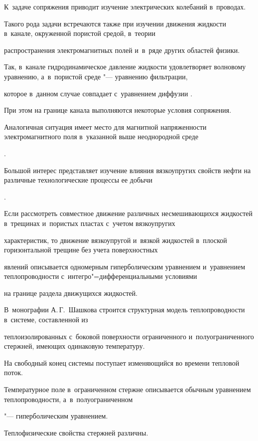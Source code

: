 К~задаче сопряжения приводит изучение электрических колебаний в~проводах.

Такого рода задачи встречаются также при изучении движения жидкости в~канале, окруженной пористой средой, в~теории

распространения электромагнитных полей и~в~ряде других областей физики.

Так, в~канале гидродинамическое давление жидкости удовлетворяет волновому уравнению, а~в~пористой среде "--- уравнению фильтрации,

которое в~данном случае совпадает с~уравнением диффузии \cite{eleevbalk:bib:Leib}.

При этом на границе канала выполняются некоторые условия сопряжения.

Аналогичная ситуация имеет место для магнитной напряженности электромагнитного поля в~указанной выше неоднородной среде

\cite{eleevbalk:bib:TixSam}.

Большой интерес представляет изучение влияния вязкоупругих свойств нефти на различные технологические процессы ее добычи

\cite{eleevbalk:bib:Aziz, eleevbalk:bib:Ak}.

Если рассмотреть совместное движение различных несмешивающихся жидкостей в~трещинах и~пористых пластах с~учетом вязкоупругих

характеристик, то движение вязкоупругой и~вязкой жидкостей в~плоской горизонтальной трещине без учета поверхностных

явлений описывается одномерным гиперболическим уравнением и~уравнением теплопроводности с~интегро"=дифференциальными условиями

на границе раздела движущихся жидкостей.



В~монографии А.\,Г.~Шашкова \cite{eleevbalk:bib:Shash} строится структурная модель теплопроводности в~системе, составленной из

теплоизолированных с~боковой поверхности ограниченного и~полуограниченного стержней, имеющих одинаковую температуру.

На свободный конец системы поступает изменяющийся во времени тепловой поток.

Температурное поле в~ограниченном стержне описывается обычным уравнением теплопроводности, а~в~полуограниченном

"--- гиперболическим уравнением.

Теплофизические свойства стержней различны.

